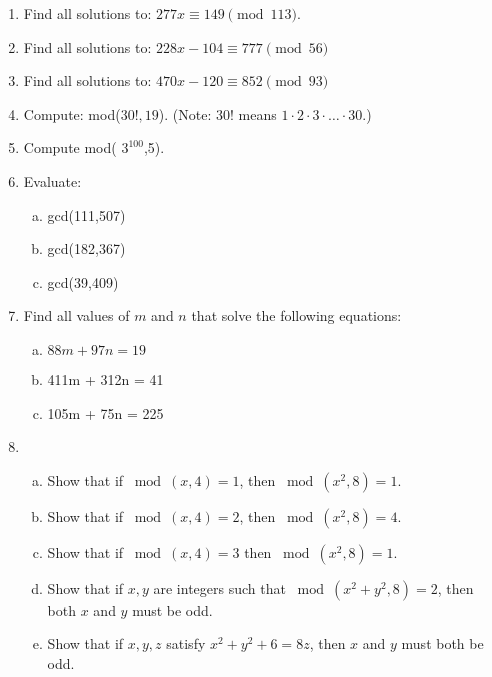 \begin{enumerate}
\item
Find all solutions to: $277x \equiv 149 \pmod{113}$.

\item
Find all solutions to:  $228 x - 104 \equiv 777 \pmod{56}$


\item
Find all solutions to:  $ 470x - 120 \equiv 852 \pmod{93}$

\item
Compute:  mod($30!,19$).  (Note: $30!$ means $1 \cdot 2 \cdot 3 \cdot \ldots \cdot 30$.)

\item
Compute mod( $3^{100}$,5). 


\item
Evaluate: 
\begin{enumerate}[(a)]
\item
 gcd(111,507) 
\item
gcd(182,367) 
\item
gcd(39,409)
\end{enumerate}

\item
Find all values of $m$ and $n$ that solve the following equations:
\begin{enumerate}[(a)]
\item
$88m + 97n = 19$
\item
 411m + 312n = 41 
\item
105m + 75n = 225
\end{enumerate}


\item
\begin{enumerate}[(a)]
\item
Show that if $\bmod(x,4)=1$, then $\bmod(x^2,8)=1$.
\item
Show that if $\bmod(x,4)=2$, then $\bmod(x^2,8) = 4$.
\item
Show that if $\bmod(x,4)=3$ then $\bmod(x^2,8) = 1$.
\item	
Show that if $x,y$  are integers such that $\bmod(x^2+y^2,8)=2$, then both $x$ and $y$ must be odd.
\item	
Show that if $x,y,z$ satisfy $x^2 + y^2 + 6 = 8z$, then $x$ and $y$ must both be odd.
\end{enumerate}




\end{enumerate}
